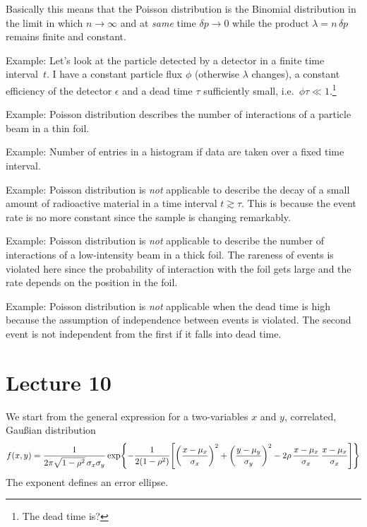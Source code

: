 \documentclass[
	10pt,
	draft
]{scrreprt}
\begin{document}
Basically this means that the Poisson distribution is the Binomial distribution in the limit in which $n\to\infty$ and at \emph{same} time $\delta p \to 0$ while the product $\lambda = n\,\delta p$ remains finite and constant.


Example: 
Let's look at the particle detected by a detector in a finite time interval~$t$.
I have a constant particle flux $\phi$ (otherwise $\lambda$ changes), a constant efficiency of the detector $\epsilon$ and a dead time $\tau$ sufficiently small, i.e.~$\phi\tau\ll1$.\footnote{The dead time is?}

Example:
Poisson distribution describes the number of interactions of a particle beam in a thin foil.

Example:
Number of entries in a histogram if data are taken over a fixed time interval.

Example:
Poisson distribution is \emph{not} applicable to describe the decay of  a small amount of radioactive material in a time interval $t \gtrsim \tau$.
This is because the event rate is no more constant since the sample is changing remarkably.

Example:
Poisson distribution is \emph{not} applicable to describe the number of interactions of a low-intensity beam in a thick foil.
The rareness of events is violated here since the probability of interaction with the foil gets large and the rate depends on the position in the foil.

Example:
Poisson distribution is \emph{not} applicable when the dead time is high because the assumption of independence between events is violated.
The second event is not independent from the first if it falls into dead time.

	\chapter{Lecture 10}

We start from the general expression for a two-variables $x$ and $y$, correlated, Gau\ss{}ian distribution
\begin{equation}
f(x,y) = \frac{1}{2\pi\sqrt{1-\rho^2}\,\sigma_x\sigma_y}\exp\gp*{-\frac{1}{2(1-\rho^2)}
\qp*{\left(\frac{x-\mu_x}{\sigma_x}\right)^2+
\left(\frac{y-\mu_y}{\sigma_y}\right)^2
-2\rho\,\frac{x-\mu_x}{\sigma_x}\,\frac{x-\mu_x}{\sigma_x}}}
\end{equation}
The exponent defines an error ellipse.
\end{document}
